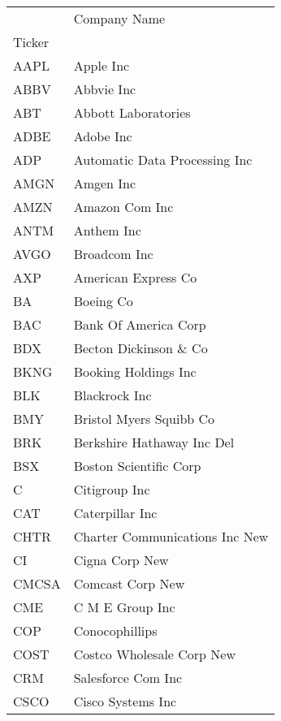 \begin{tabular}{ll}
\toprule
{} &                      Company Name \\
Ticker &                                   \\
\midrule
AAPL   &                         Apple Inc \\
ABBV   &                        Abbvie Inc \\
ABT    &               Abbott Laboratories \\
ADBE   &                         Adobe Inc \\
ADP    &     Automatic Data Processing Inc \\
AMGN   &                         Amgen Inc \\
AMZN   &                    Amazon Com Inc \\
ANTM   &                        Anthem Inc \\
AVGO   &                      Broadcom Inc \\
AXP    &               American Express Co \\
BA     &                         Boeing Co \\
BAC    &              Bank Of America Corp \\
BDX    &            Becton Dickinson \& Co \\
BKNG   &              Booking Holdings Inc \\
BLK    &                     Blackrock Inc \\
BMY    &           Bristol Myers Squibb Co \\
BRK    &        Berkshire Hathaway Inc Del \\
BSX    &            Boston Scientific Corp \\
C      &                     Citigroup Inc \\
CAT    &                   Caterpillar Inc \\
CHTR   &    Charter Communications Inc New \\
CI     &                    Cigna Corp New \\
CMCSA  &                  Comcast Corp New \\
CME    &                   C M E Group Inc \\
COP    &                    Conocophillips \\
COST   &         Costco Wholesale Corp New \\
CRM    &                Salesforce Com Inc \\
CSCO   &                 Cisco Systems Inc \\

\end{tabular}
